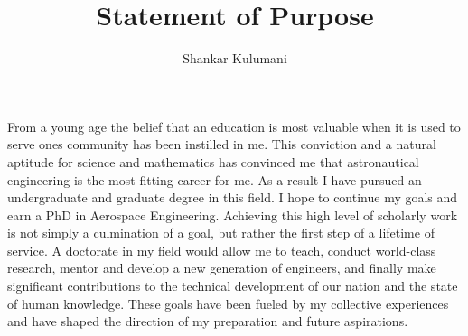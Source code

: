 \documentclass[12pt, oneside]{article}   	%
\title{Statement of Purpose}
\author{Shankar Kulumani}
\date{}							%
\begin{document}
\maketitle

\begin{comment}
On the first day of Astro 310, the introductory astronautics course at the US Air Force Academy, my professor asked bluntly, ``What have you learned so far?''
Some stated that they knew trigonometry; to which the professor replied `` Well, that brings you up to about the year 300 B.C.''
Another would reply that we had all learned calculus as well, which would be answered with another equally blunt statement of ``You're now all the way to about the 1700s.''
It was at this point where I finally realized that the wave of human knowledge continually moves forward and I want to lead it.
My goal is to obtain a PhD in Aerospace Engineering and attempt to contribute to the field in the same manner as all those who have come before me.
 \end{comment}

From a young age the belief that an education is most valuable when it is used to serve ones community has been instilled in me. 
This conviction and a natural aptitude for science and mathematics has convinced me that astronautical engineering is the most fitting career for me.
As a result I have pursued an undergraduate and graduate degree in this field.
I hope to continue my goals and earn a PhD in Aerospace Engineering.
Achieving this high level of scholarly work is not simply a culmination of a goal, but rather the first step of a lifetime of service. 
A doctorate in my field would allow me to teach, conduct world-class research, mentor and develop a new generation of engineers, and finally make significant contributions to the technical development of our nation and the state of human knowledge.
These goals have been fueled by my collective experiences and have shaped the direction of my preparation and future aspirations.
\end{document}
